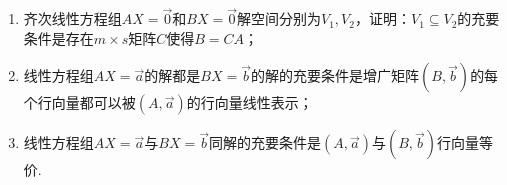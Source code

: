 \begin{enumerate}
\begin{enumerate}
              \item 齐次线性方程组$AX=\vec{0}$和$BX=\vec{0}$解空间分别为$V_1,V_2$，证明：$V_1 \subseteq V_2$的充要条件是存在$m \times s$矩阵$C$使得$B=CA$；

              \item 线性方程组$AX=\vec{a}$的解都是$BX=\vec{b}$的解的充要条件是增广矩阵$(B,\vec{b})$的每个行向量都可以被$(A,\vec{a})$的行向量线性表示；

              \item 线性方程组$AX=\vec{a}$与$BX=\vec{b}$同解的充要条件是$(A,\vec{a})$与$(B,\vec{b})$行向量等价.
          \end{enumerate}
\end{enumerate}
